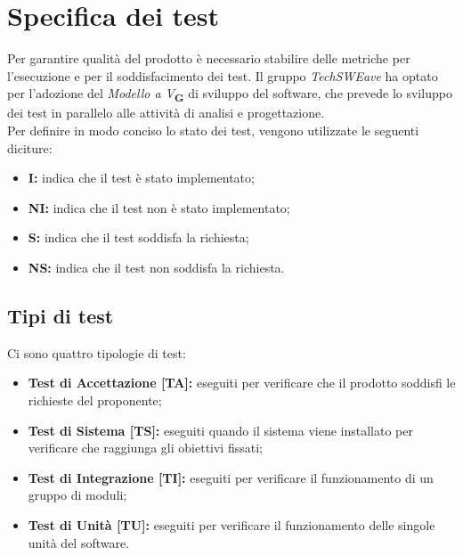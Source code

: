 \section{Specifica dei test}
Per garantire qualità del prodotto è necessario stabilire delle metriche per l’esecuzione e per il soddisfacimento dei test.
Il gruppo \textit{TechSWEave} ha optato per l'adozione del \textit{Modello a V}\textsubscript{\textbf{G}} di sviluppo del software, che
prevede lo sviluppo dei test in parallelo alle attività di analisi e progettazione.\\
Per definire in modo conciso lo stato dei test, vengono utilizzate le seguenti diciture:
\begin{itemize}
    \item \textbf{I:} indica che il test è stato implementato;
    \item \textbf{NI:} indica che il test non è stato implementato;
    \item \textbf{S:} indica che il test soddisfa la richiesta;
    \item \textbf{NS:} indica che il test non soddisfa la richiesta.
\end{itemize}
\subsection{Tipi di test}
Ci sono quattro tipologie di test:
\begin{itemize}
    \item \textbf{Test di Accettazione [TA]:} eseguiti per verificare che il prodotto soddisfi le richieste del proponente;
    \item \textbf{Test di Sistema [TS]:} eseguiti quando il sistema viene installato per verificare che raggiunga gli obiettivi fissati;
    \item \textbf{Test di Integrazione [TI]:} eseguiti per verificare il funzionamento di un gruppo di moduli;
    \item \textbf{Test di Unit\`a [TU]:} eseguiti per verificare il funzionamento delle singole unit\`a del software.
\end{itemize}
